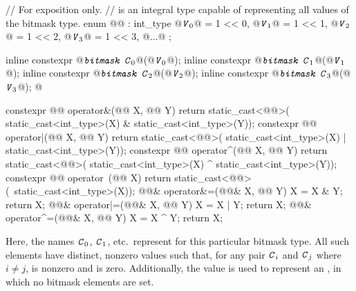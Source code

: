 \begin{codeblock}
// For exposition only.
//  is an integral type capable of representing all values of the bitmask type.
enum @@ : int_type {
  @$\texttt{\textit{V}}_{0}$@ = 1 << 0, @$\texttt{\textit{V}}_{1}$@ = 1 << 1, @$\texttt{\textit{V}}_{2}$@ = 1 << 2, @$\texttt{\textit{V}}_{3}$@ = 1 << 3, @$\ldots$@
};

inline constexpr @$\texttt{\textit{bitmask C}}_{0}$@(@$\texttt{\textit{V}}_{0}{}$@);
inline constexpr @$\texttt{\textit{bitmask C}}_{1}$@(@$\texttt{\textit{V}}_{1}{}$@);
inline constexpr @$\texttt{\textit{bitmask C}}_{2}$@(@$\texttt{\textit{V}}_{2}{}$@);
inline constexpr @$\texttt{\textit{bitmask C}}_{3}$@(@$\texttt{\textit{V}}_{3}{}$@);
  @\vdots@

constexpr @@ operator&(@@ X, @@ Y) {
  return static_cast<@@>(
    static_cast<int_type>(X) & static_cast<int_type>(Y));
}
constexpr @@ operator|(@@ X, @@ Y) {
  return static_cast<@@>(
    static_cast<int_type>(X) | static_cast<int_type>(Y));
}
constexpr @@ operator^(@@ X, @@ Y){
  return static_cast<@@>(
    static_cast<int_type>(X) ^ static_cast<int_type>(Y));
}
constexpr @@ operator~(@@ X){
  return static_cast<@@>(~static_cast<int_type>(X));
}
@@& operator&=(@@& X, @@ Y){
  X = X & Y; return X;
}
@@& operator|=(@@& X, @@ Y) {
  X = X | Y; return X;
}
@@& operator^=(@@& X, @@ Y) {
  X = X ^ Y; return X;
}
\end{codeblock}

\pnum
Here, the names $\texttt{\textit{C}}_0$,
$\texttt{\textit{C}}_1$, etc.\ represent
for this particular bitmask type.
%
All such elements have distinct, nonzero values such that, for any pair $\texttt{\textit{C}}_i$
and $\texttt{\textit{C}}_j$ where $i \neq j$,  is nonzero and
 is zero.
Additionally, the value  is used to represent an , in which no
bitmask elements are set.


